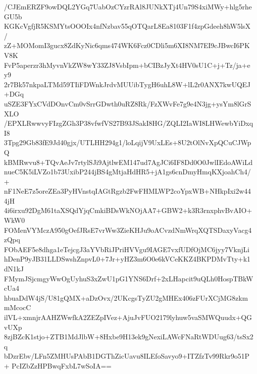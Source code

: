 /CJEmERZF9owDQL2YGq7UabOzCYzrRAl8JUNkXTj4Un79S4xiMWy+hlg5rheGU5b
KGKcVgfjR5KSMYtsOOOIx4nfNzbav55qOTQarL8Ea8103F1f4zpGdeeh8hW5lsX/
zZ+MOMomI3gucx8ZdKyNic6qms474WK6Fcz0CDli5m6XI8NM7EI9cJBwcI6PKV8K
FvP5aperzr3hMyvnVkZW8wY33ZJ8VsbIpm+bCIBzJyXt4HV0sU1C+j+Tz/ja+ey9
2r7Bk57nkpaLTMd59TIiFDWnkJrdvMUUibTygH6uhL8W+lL2r0ANX7kwUQEJ+DGq
uSZE3FYxCVdDOnvCm0vSrrGDwth0uRZ8Rk/FzXWvFe7g9e4N3jg+ysYm8lGrSXLO
/EPXLRwwvyFIzgZGh3P38vfwfVS27B93JSakI8HG/ZQLI2IaWI8LHWewbYiDxqI8
3Tpg29Gb83fE9Jd40gjx/UTLHH294g1/loLqijV9UxLEs+8U2tOlNvXpQCuCJWpQ
kBMRwvu8+TQvAeJv7rtylSJi9AjtlwEM147ud7AgJCi6IF8Dd0O0JwlIEdoAWiLd
nueC5K5iLVZo1b73UxibP244jBS4gMtjaHdHR5+jA1gs6cnDmyHmqKXjoahCh4/+
nF1NeE7z5oreZEa3PyHVnstqIAGtRgzb2FwFHMLWP2coYpxWB+NHkpIxi2w444jH
4i6irxu92DgM61taXSQdYjqCmkiBDsWkNOjAA7+GBW2+k3R3rnxphvBvAIO+WkW0
FOMenVYMczA950gOefJRsE7vrWw3ZieKHJu9oACvzdNmWrqXQTSDaxyVacg4zQpq
FObAEF5e8dhga1eTejcgJ3aYVbRiJPriHVVgu9IAGE7vxfUDfOjMC6jyy7VknjLi
hDenP9yJB31LLDSwshZnpvL0+7Jr+yHZ3m6O0e6kVCeKKZ4BKPDMvTty+k1dN1kJ
FMymJSjcmgyWwOgUyhuS3xZwU1pG1YNS6Drf+2xLHapcit9uQLh0HospTBkWcUa4
hbuaDdW4jS/U81gQMX+aDzOvx/2UKcgsTyZU2gMHEx406zFUrXCjMG8zkmmMcocC
ilVL+xmnjrAAHZWwfkA2ZEZpIVez+AjuJvFUO2179lyhuw5vaSMWQuudx+QGvUXp
8zjBZcK1stjo+ZTB1MdJlbW+8Hxbe9H13ek9gNexiLAWcFNaRtWDUug63/tsSx2q
bDzrEbv/LFn5ZMHUsPAbB1DGThZicUavu8ILEfoSavyo9+ITZfzTv99Rkr9o51P+
PcIZbZzHPBwqFxbL7wSoIA==
